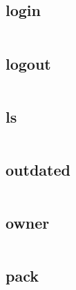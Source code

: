 \subsection{login}



\begin{lstlisting}[language=bash]

\end{lstlisting}

\subsection{logout}



\begin{lstlisting}[language=bash]

\end{lstlisting}

\subsection{ls}



\begin{lstlisting}[language=bash]

\end{lstlisting}

\subsection{outdated}


\begin{lstlisting}[language=bash]

\end{lstlisting}


\subsection{owner}


\begin{lstlisting}[language=bash]

\end{lstlisting}

\subsection{pack}


\begin{lstlisting}[language=bash]

\end{lstlisting}


